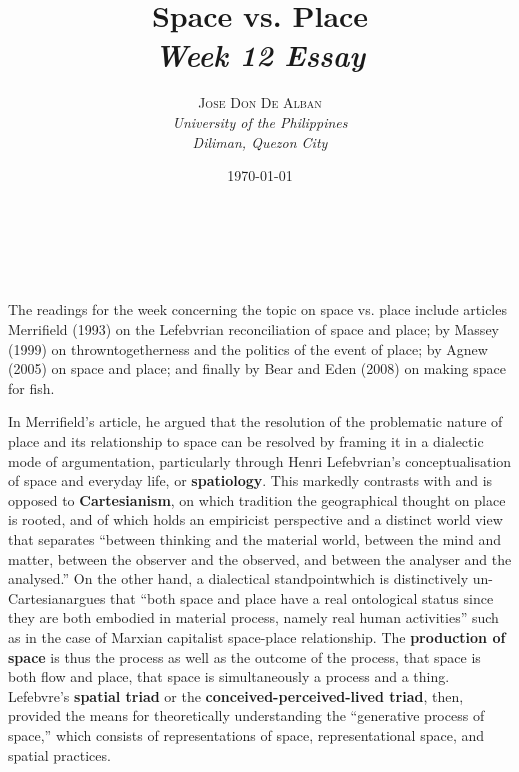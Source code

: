 \documentclass[a4paper, 10.5pt]{article} %
\title{\textbf{Space vs. Place}\\ %
\textsl{Week 12 Essay}} %
\author{\textsc{Jose Don De Alban} %
\\{\textit{University of the Philippines} %
\\{\textit{Diliman, Quezon City}}}} %
\date{\today} %
\makeatletter
\renewcommand{\maketitle}
{
\begin{flushright} %
{\LARGE\@title} %
\vspace{40pt} %

{\large\@author} %
\\\@date %

\vspace{10pt} %
\end{flushright}
}
\makeatother
\begin{document}
\maketitle %


\section*{}

The readings for the week concerning the topic on space vs. place include articles Merrifield (1993) \cite{merrifield_1993} on the Lefebvrian reconciliation of space and place; by Massey (1999) \cite{massey_1999} on throwntogetherness and the politics of the event of place; by Agnew (2005) \cite{agnew_2005} on space and place; and finally by Bear and Eden (2008) \cite{bear_eden_2008} on making space for fish.

In Merrifield's article, he argued that the resolution of the problematic nature of place and its relationship to space can be resolved by framing it in a dialectic mode of argumentation, particularly through Henri Lefebvrian's conceptualisation of space and everyday life, or \textbf{spatiology}. This markedly contrasts with and is opposed to \textbf{Cartesianism}, on which tradition the geographical thought on place is rooted, and of which holds an empiricist perspective and a distinct world view that separates \enquote{between thinking and the material world, between the mind and matter, between the observer and the observed, and between the analyser and the analysed.} On the other hand, a dialectical standpoint\textemdash{}which is distinctively un-Cartesian\textemdash{}argues that \enquote{both space and place have a real ontological status since they are both embodied in material process, namely real human activities} such as in the case of Marxian capitalist space-place relationship. The \textbf{production of space} is thus the process as well as the outcome of the process, that space is both flow and place, that space is simultaneously a process and a thing. Lefebvre's \textbf{spatial triad} or the \textbf{conceived-perceived-lived triad}, then, provided the means for theoretically understanding the \enquote{generative process of space,} which consists of representations of space, representational space, and spatial practices.
\end{document}
